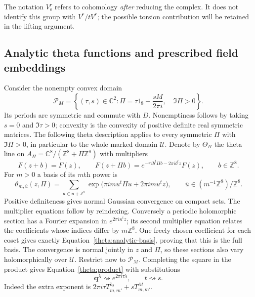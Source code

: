 \documentclass[11pt]{article}
\theoremstyle{definition}
\theoremstyle{remark}
\numberwithin{equation}{section}
\begin{document}
The notation $V_{\mathrm s}^r$ refers to cohomology \emph{after} reducing the
complex.  It does not identify this group with $V^r/tV^r$; the possible
torsion contribution will be retained in the lifting argument.

\subsection{Analytic theta functions and prescribed field embeddings}

Consider the nonempty convex domain
\begin{equation}\label{theta:period-domain}
 \mathcal P_M=
 \left\{(\tau,s)\in\mathbb C^2:
    \Pi=\tau1_8+\frac{sM}{2\pi i},\quad\Im\Pi>0\right\}.
\end{equation}
Its periods are symmetric and commute with $D$.  Nonemptiness follows
by taking $s=0$ and $\Im\tau>0$; convexity is the convexity of positive
definite real symmetric matrices.  The following theta description applies
to every symmetric $\Pi$ with $\Im\Pi>0$, in particular to the whole
marked domain $\mathcal U$.  Denote by $\Theta_\Pi$ the theta line
on $A_\Pi=\mathbb C^8/(\mathbb Z^8+\Pi\mathbb Z^8)$ with multipliers
\[
 F(z+b)=F(z),\qquad
 F(z+\Pi b)=e^{-\pi i b^t\Pi b-2\pi i b^tz}F(z),
 \qquad b\in\mathbb Z^8.
\]
For $m>0$ a basis of its $m$th power is
\begin{equation}\label{theta:analytic-basis}
 \vartheta_{m,\bar u}(z,\Pi)
 =\sum_{u\in\bar u+\mathbb Z^8}
       \exp\bigl(\pi i m u^t\Pi u+2\pi i m u^tz\bigr),
 \qquad \bar u\in(m^{-1}\mathbb Z^8)/\mathbb Z^8.
\end{equation}
Positive definiteness gives normal Gaussian convergence on compact sets.
The multiplier equations follow by reindexing.  Conversely a periodic
holomorphic section has a Fourier expansion in $e^{2\pi i n^tz}$; its
second multiplier equation relates the coefficients whose indices differ
by $m\mathbb Z^8$.  One freely chosen coefficient for each coset gives exactly
Equation~\eqref{theta:analytic-basis}, proving that this is the full basis.
The convergence is normal jointly in $z$ and $\Pi$, so these sections
also vary holomorphically over $\mathcal U$.
Restrict now to $\mathcal P_M$.  Completing the square in the product gives
Equation~\eqref{theta:product} with substitutions
\begin{equation}\label{theta:analytic-substitution}
 \mathbf q^\lambda\rightsquigarrow e^{2\pi i\tau\lambda},
 \qquad t\rightsquigarrow s.
\end{equation}
Indeed the extra exponent is
$2\pi i\tau T^{1_8}_{m,m'}+sT^M_{m,m'}$.
\end{document}
